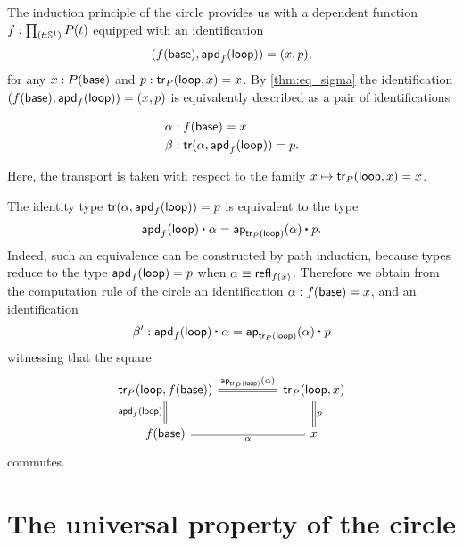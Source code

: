 \begin{rmk}
The induction principle of the circle provides us with a dependent function $f:\prd{t:\sphere{1}}P(t)$ equipped with an identification
\begin{equation*}
(f(\mathsf{base}),\mathsf{apd}_{f}\mathopen{}\left(\mathsf{loop}\right)\mathclose{})=(x,p),
\end{equation*}
for any $x : P(\mathsf{base})$ and $p : \mathsf{tr}_P(\mathsf{loop},x)=x$. By \cref{thm:eq_sigma} the identification
$(f(\mathsf{base}),\mathsf{apd}_{f}\mathopen{}\left(\mathsf{loop}\right)\mathclose{})=(x,p)$ is equivalently described as a pair of identifications
\begin{samepage}
\begin{align*}
\alpha & : f(\mathsf{base})= x \\
\beta & : \mathsf{tr}(\alpha,\mathsf{apd}_{f}\mathopen{}\left(\mathsf{loop}\right)\mathclose{}) = p.
\end{align*}\end{samepage}%
Here, the transport is taken with respect to the family $x\mapsto \mathsf{tr}_P(\mathsf{loop},x)=x$. 

The identity type $\mathsf{tr}(\alpha,\mathsf{apd}_{f}\mathopen{}\left(\mathsf{loop}\right)\mathclose{}) = p$ is equivalent to the type
\begin{equation*}
\ct{\apd{f}{\lloop}}{\alpha}=\ct{\mathsf{ap}_{\mathsf{tr}_P(\lloop)}(\alpha)}{p}.
\end{equation*}
Indeed, such an equivalence can be constructed by path induction, because types reduce to the type $\mathsf{apd}_{f}\mathopen{}\left(\mathsf{loop}\right)\mathclose{}=p$ when $\alpha\equiv\mathsf{refl}_{f(x)}$. Therefore we obtain from the computation rule of the circle an identification $\alpha:f(\mathsf{base})=x$, and an identification
\begin{equation*}
\beta':\ct{\apd{f}{\lloop}}{\alpha}=\ct{\mathsf{ap}_{\mathsf{tr}_P(\lloop)}(\alpha)}{p}
\end{equation*}
witnessing that the square
\begin{equation*}
\begin{tikzcd}[column sep=huge]
\mathsf{tr}_P(\lloop,f(\base)) \arrow[d,equals,swap,"\apd{f}{\lloop}"] \arrow[r,equals,"\ap{\mathsf{tr}_P(\lloop)}{\alpha}"] & \mathsf{tr}_P(\lloop,x) \arrow[d,equals,"p"] \\
f(\base) \arrow[r,equals,swap,"\alpha"] & x
\end{tikzcd}
\end{equation*}
commutes.
\end{rmk}

\section{The universal property of the circle}

